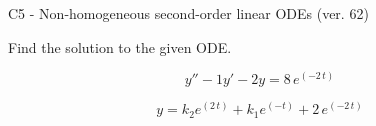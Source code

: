 \begin{exercise}
  \begin{exerciseTitle}C5 - Non-homogeneous second-order linear ODEs (ver. 62)\end{exerciseTitle}
  \begin{exerciseStatement}
    
Find the solution to the given ODE.

    
\[y''-1y'-2y = 8 \, e^{\left(-2 \, t\right)}\]

  \end{exerciseStatement}
  \begin{exerciseAnswer}
    
\[y= k_{2} e^{\left(2 \, t\right)} + k_{1} e^{\left(-t\right)} + 2 \, e^{\left(-2 \, t\right)}\]

  \end{exerciseAnswer}
\end{exercise}